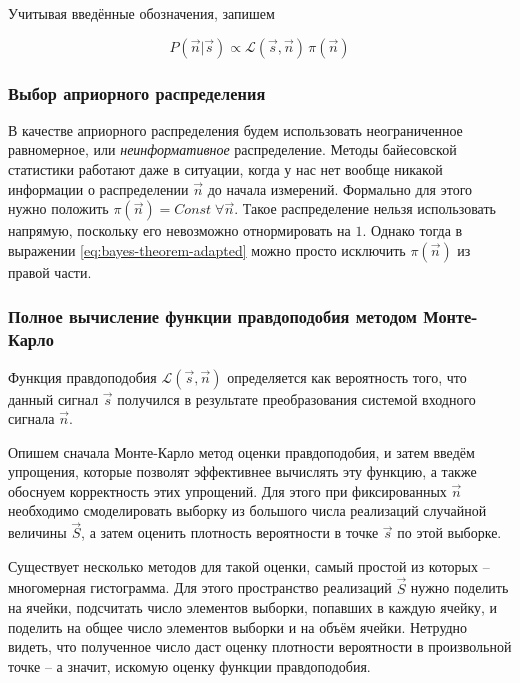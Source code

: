 \documentclass[12pt]{book}
\begin{document}
	Учитывая введённые обозначения, запишем

	\begin{equation}
		\label{eq:bayes-theorem-adapted}
		P(\vec{n} | \vec{s}) \propto \mathcal{L}(\vec{s}, \vec{n}) \, \pi(\vec{n})
	\end{equation}

	\subsubsection{Выбор априорного распределения}
	
	В качестве априорного распределения будем использовать неограниченное равномерное, или \textit{неинформативное} распределение. Методы байесовской статистики работают даже в ситуации, когда у нас нет вообще никакой информации о распределении $\vec{n}$ до начала измерений. Формально для этого нужно положить $\pi(\vec{n}) = Const \; \forall \vec{n}$. Такое распределение нельзя использовать напрямую, поскольку его невозможно отнормировать на $1$. Однако тогда в выражении \ref{eq:bayes-theorem-adapted} можно просто исключить $\pi(\vec{n})$ из правой части.

	\subsubsection{Полное вычисление функции правдоподобия методом Монте-Карло}
	
	\label{sec:naive-monte-carlo-likelihood}

	Функция правдоподобия $\mathcal{L}(\vec{s}, \vec{n})$ определяется как вероятность того, что данный сигнал $\vec{s}$ получился в результате преобразования системой входного сигнала $\vec{n}$.

	Опишем сначала Монте-Карло метод оценки правдоподобия, и затем введём упрощения, которые позволят эффективнее вычислять эту функцию, а также обоснуем корректность этих упрощений. Для этого при фиксированных $\vec{n}$ необходимо смоделировать выборку из большого числа реализаций случайной величины $\vec{S}$, а затем оценить плотность вероятности в точке $\vec{s}$ по этой выборке.
	
	Существует несколько методов для такой оценки, самый простой из которых -- многомерная гистограмма. Для этого пространство реализаций $\vec{S}$ нужно поделить на ячейки, подсчитать число элементов выборки, попавших в каждую ячейку, и поделить на общее число элементов выборки и на объём ячейки. Нетрудно видеть, что полученное число даст оценку плотности вероятности в произвольной точке -- а значит, искомую оценку функции правдоподобия.
	
\end{document}
